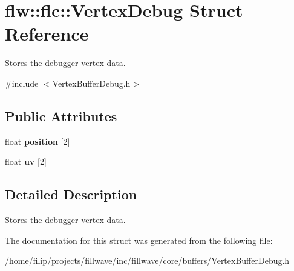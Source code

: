 \hypertarget{structflw_1_1flc_1_1VertexDebug}{}\section{flw\+:\+:flc\+:\+:Vertex\+Debug Struct Reference}
\label{structflw_1_1flc_1_1VertexDebug}


Stores the debugger vertex data.  




{\ttfamily \#include $<$Vertex\+Buffer\+Debug.\+h$>$}

\subsection*{Public Attributes}
\begin{DoxyCompactItemize}
\item 
\mbox{\label{structflw_1_1flc_1_1VertexDebug_a7a5c6d20040bba39797557c8f4dd9ec9}} 
float {\bfseries position} \mbox{[}2\mbox{]}
\item 
\mbox{\label{structflw_1_1flc_1_1VertexDebug_a878178542fbb4713cb0c1495ca5fd27b}} 
float {\bfseries uv} \mbox{[}2\mbox{]}
\end{DoxyCompactItemize}


\subsection{Detailed Description}
Stores the debugger vertex data. 

The documentation for this struct was generated from the following file\+:\begin{DoxyCompactItemize}
\item 
/home/filip/projects/fillwave/inc/fillwave/core/buffers/Vertex\+Buffer\+Debug.\+h\end{DoxyCompactItemize}
